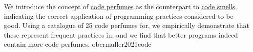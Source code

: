 \documentclass{article}
\begin{document}

  {We introduce the concept of \ul{code perfumes} as the counterpart to \ul{code smells}, indicating the correct application of programming practices considered to be good. Using a catalogue of 25 code perfumes for, we empirically demonstrate that these represent frequent practices in, and we find that better programs indeed contain more code perfumes.}
  {obermuller2021code}
\end{document}

